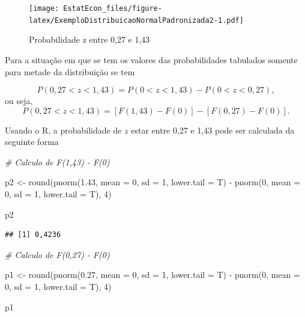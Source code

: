 \documentclass[
]{book}
\newenvironment{Shaded}{\begin{snugshade}}{\end{snugshade}}
\newcommand{\AttributeTok}[1]{\textcolor[rgb]{0.77,0.63,0.00}{#1}}
\newcommand{\CommentTok}[1]{\textcolor[rgb]{0.56,0.35,0.01}{\textit{#1}}}
\newcommand{\DecValTok}[1]{\textcolor[rgb]{0.00,0.00,0.81}{#1}}
\newcommand{\FloatTok}[1]{\textcolor[rgb]{0.00,0.00,0.81}{#1}}
\newcommand{\FunctionTok}[1]{\textcolor[rgb]{0.00,0.00,0.00}{#1}}
\newcommand{\NormalTok}[1]{#1}
\newcommand{\OtherTok}[1]{\textcolor[rgb]{0.56,0.35,0.01}{#1}}
\newcommand{\SpecialCharTok}[1]{\textcolor[rgb]{0.00,0.00,0.00}{#1}}
\begin{document}
\begin{figure}
\centering
\texttt{[image: EstatEcon\_files/figure-latex/ExemploDistribuicaoNormalPadronizada2-1.pdf]}
\caption{\label{fig:ExemploDistribuicaoNormalPadronizada2}Probabilidade z entre 0,27 e 1,43}
\end{figure}

Para a situação em que se tem os valores das probabilidades tabulados somente para metade da distribuição se tem

\[
  P(0,27 < z < 1,43) = P(0 < z < 1,43) - P(0 < z < 0,27),
\]
ou seja,
\[
  P(0,27 < z < 1,43) = [F(1,43) - F(0)] - [F(0,27) - F(0)].
\]

Usando o R, a probabilidade de \(z\) estar entre 0,27 e 1,43 pode ser calculada da seguinte forma

\begin{Shaded}
\begin{Highlighting}[]
\CommentTok{\# Calculo de F(1,43) {-} F(0)}

\NormalTok{p2 }\OtherTok{\textless{}{-}} \FunctionTok{round}\NormalTok{(}\FunctionTok{pnorm}\NormalTok{(}\FloatTok{1.43}\NormalTok{, }\AttributeTok{mean =} \DecValTok{0}\NormalTok{, }\AttributeTok{sd =} \DecValTok{1}\NormalTok{, }\AttributeTok{lower.tail =}\NormalTok{ T) }\SpecialCharTok{{-}} 
    \FunctionTok{pnorm}\NormalTok{(}\DecValTok{0}\NormalTok{, }\AttributeTok{mean =} \DecValTok{0}\NormalTok{, }\AttributeTok{sd =} \DecValTok{1}\NormalTok{, }\AttributeTok{lower.tail =}\NormalTok{ T), }\DecValTok{4}\NormalTok{)}

\NormalTok{p2}
\end{Highlighting}
\end{Shaded}

\begin{verbatim}
## [1] 0,4236
\end{verbatim}

\begin{Shaded}
\begin{Highlighting}[]
\CommentTok{\# Calculo de F(0,27) {-} F(0)}

\NormalTok{p1 }\OtherTok{\textless{}{-}} \FunctionTok{round}\NormalTok{(}\FunctionTok{pnorm}\NormalTok{(}\FloatTok{0.27}\NormalTok{, }\AttributeTok{mean =} \DecValTok{0}\NormalTok{, }\AttributeTok{sd =} \DecValTok{1}\NormalTok{, }\AttributeTok{lower.tail =}\NormalTok{ T) }\SpecialCharTok{{-}} 
    \FunctionTok{pnorm}\NormalTok{(}\DecValTok{0}\NormalTok{, }\AttributeTok{mean =} \DecValTok{0}\NormalTok{, }\AttributeTok{sd =} \DecValTok{1}\NormalTok{, }\AttributeTok{lower.tail =}\NormalTok{ T), }\DecValTok{4}\NormalTok{)}

\NormalTok{p1}
\end{Highlighting}
\end{Shaded}
\end{document}
